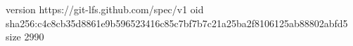 version https://git-lfs.github.com/spec/v1
oid sha256:c4c8cb35d8861e9b596523416c85c7bf7b7c21a25ba2f8106125ab88802abfd5
size 2990
